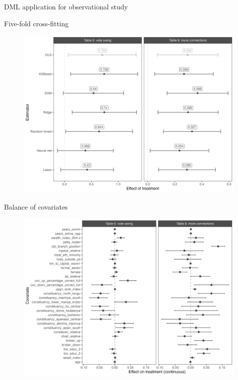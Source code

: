 \documentclass[10pt,table,aspectratio=169]{beamer}
\begin{document}
\begin{frame}[plain, label = two_dimensions]{DML application for observational study}

Five-fold cross-fitting

\begin{figure}[H]
 \includegraphics[width=0.8\linewidth]{figures/observational_coefplot_dml.png}
\end{figure}

\end{frame}


\begin{frame}[plain, label = two_dimensions]{Balance of covariates}

\begin{figure}[H]
 \includegraphics[width=0.8\linewidth]{figures/observational_coefplot_balance.png}
\end{figure}

\end{frame}
\end{document}
